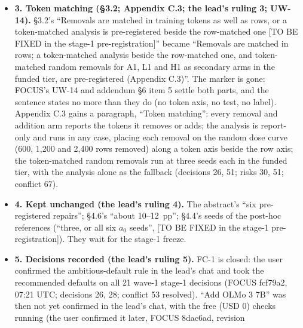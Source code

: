 \documentclass{article}
\theoremstyle{plain}
\theoremstyle{definition}
\theoremstyle{remark}
\begin{document}
\begin{itemize}
        comparison of OLMo-2, Llama-3 and Qwen2.5 is gone (\S{}4.1 keeps its two
        other citations of the concurrent submission). Sources: FOCUS 7 Oct
        20:58 UTC (``Llama and OLMo only''; the confirming Qwen seeds and ``a
        Qwen backup at Qi's LR 2e-5 \ldots{} cancelled before launch''); FOCUS's
        screening list (Qwen 1.5B recipe B +75.2~pp); the per-family rule of 9
        Oct 09:29 UTC (risk 56; conflicts 54, 69).
  \item \textbf{3. Token matching (\S{}3.2; Appendix C.3; the lead's ruling 3;
        UW-14).} \S{}3.2's ``Removals are matched in training tokens as well as
        rows, or a token-matched analysis is pre-registered beside the
        row-matched one [TO BE FIXED in the stage-1 pre-registration]'' became
        ``Removals are matched in rows; a token-matched analysis beside the
        row-matched one, and token-matched random removals for A1, L1 and H1 as
        secondary arms in the funded tier, are pre-registered (Appendix C.3)''.
        The marker is gone: FOCUS's UW-14 and addendum \S{}6 item 5 settle both
        parts, and the sentence states no more than they do (no token axis, no
        test, no label). Appendix C.3 gains a paragraph, ``Token matching'':
        every removal and addition arm reports the tokens it removes or adds;
        the analysis is report-only and runs in any case, placing each removal
        on the random dose curve (600, 1,200 and 2,400 rows removed) along a
        token axis beside the row axis; the token-matched random removals run at
        three seeds each in the funded tier, with the analysis alone as the
        fallback (decisions 26, 51; risks 30, 51; conflict 67).
  \item \textbf{4. Kept unchanged (the lead's ruling 4).} The abstract's ``six
        pre-registered repairs''; \S{}4.6's ``about 10--12~pp''; \S{}4.4's seeds
        of the post-hoc references (``three, or all six $a_0$ seeds'', [TO BE
        FIXED in the stage-1 pre-registration]). They wait for the stage-1
        freeze.
  \item \textbf{5. Decisions recorded (the lead's ruling 5).} FC-1 is closed:
        the user confirmed the ambitious-default rule in the lead's chat and
        took the recommended defaults on all 21 wave-1 stage-1 decisions (FOCUS
        fcf79a2, 07:21 UTC; decisions 26, 28; conflict 53 resolved). ``Add OLMo
        3 7B'' was then not yet confirmed in the lead's chat, with the free (USD
        0) checks running (the user confirmed it later, FOCUS 8dac6ad, revision

\end{itemize}
\end{document}
